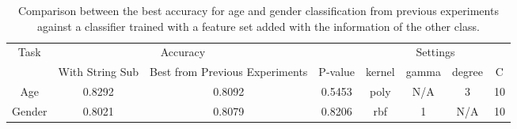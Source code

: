 \documentclass[a4paper]{llncs}
\begin{document}
\begin{table}[!htbp]
\centering
\begin{tabular}{|c|c|c|c|c|c|c|c|}
\hline
\multirow{2}{*}{Task} & \multicolumn{2}{c|}{Accuracy}                    &         & \multicolumn{4}{c|}{Settings} \\ \cline{2-8} 
                      & With String Sub & Best from Previous Experiments & P-value & kernel  & gamma & degree & C  \\ \hline
Age                   & 0.8292          & 0.8092                         & 0.5453  & poly    & N/A   & 3      & 10 \\ \hline
Gender                & 0.8021          & 0.8079                         & 0.8206  & rbf     & 1     & N/A    & 10 \\ \hline
\end{tabular}
\caption{Comparison between the best accuracy for age and gender classification from previous experiments against a classifier trained with a feature set added with the information of the other class.}
\label{table:WithPriors}
\end{table}
\end{document}
